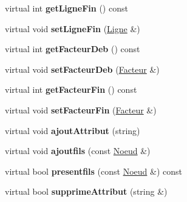 \begin{DoxyCompactItemize}
\item 
\hypertarget{classNoeud_aab6e8f8deacca928d2eb1750473371e2}{
virtual int {\bfseries getLigneFin} () const }
\label{classNoeud_aab6e8f8deacca928d2eb1750473371e2}

\item 
\hypertarget{classNoeud_ab6a13086450c40dd3c3cf97623e221b3}{
virtual void {\bfseries setLigneFin} (\hyperlink{classLigne}{Ligne} \&)}
\label{classNoeud_ab6a13086450c40dd3c3cf97623e221b3}

\item 
\hypertarget{classNoeud_a1d1aa4242f85ec3d08c95356d12f3402}{
virtual int {\bfseries getFacteurDeb} () const }
\label{classNoeud_a1d1aa4242f85ec3d08c95356d12f3402}

\item 
\hypertarget{classNoeud_a151533b22d7cd256fe4fe82bd91a9cfc}{
virtual void {\bfseries setFacteurDeb} (\hyperlink{classFacteur}{Facteur} \&)}
\label{classNoeud_a151533b22d7cd256fe4fe82bd91a9cfc}

\item 
\hypertarget{classNoeud_adfbbf10d9e0d33fb428d1bbaa6ede8e8}{
virtual int {\bfseries getFacteurFin} () const }
\label{classNoeud_adfbbf10d9e0d33fb428d1bbaa6ede8e8}

\item 
\hypertarget{classNoeud_a54e787d47be1ae8fccbe5bd17d308180}{
virtual void {\bfseries setFacteurFin} (\hyperlink{classFacteur}{Facteur} \&)}
\label{classNoeud_a54e787d47be1ae8fccbe5bd17d308180}

\item 
\hypertarget{classNoeud_af0d6723b082b7ea621110089a5d96fc4}{
virtual void {\bfseries ajoutAttribut} (string)}
\label{classNoeud_af0d6723b082b7ea621110089a5d96fc4}

\item 
\hypertarget{classNoeud_a34182dcdc815394c81dee110de8884c9}{
virtual void {\bfseries ajoutfils} (const \hyperlink{classNoeud}{Noeud} \&)}
\label{classNoeud_a34182dcdc815394c81dee110de8884c9}

\item 
\hypertarget{classNoeud_a04519b75d0718f028532ae2286114f7b}{
virtual bool {\bfseries presentfils} (const \hyperlink{classNoeud}{Noeud} \&) const }
\label{classNoeud_a04519b75d0718f028532ae2286114f7b}

\item 
\hypertarget{classNoeud_a449e9a566a12cb8164963b3790fbad0a}{
virtual bool {\bfseries supprimeAttribut} (string \&)}
\label{classNoeud_a449e9a566a12cb8164963b3790fbad0a}


\end{DoxyCompactItemize}
